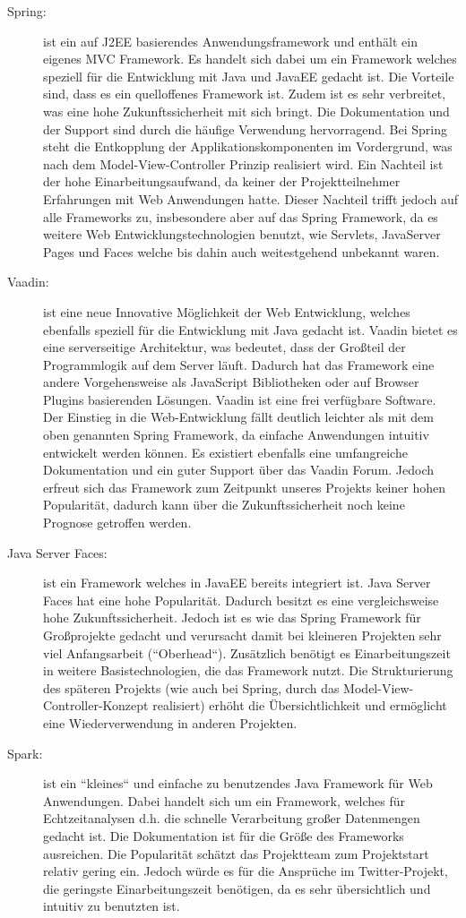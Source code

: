 \begin{description}
	\item [Spring:] ist ein auf J2EE basierendes Anwendungsframework und enthält ein eigenes MVC Framework. Es handelt sich dabei um ein Framework welches speziell für die Entwicklung mit Java und JavaEE gedacht ist. Die Vorteile sind, dass es ein quelloffenes Framework ist. Zudem ist es sehr verbreitet, was eine hohe Zukunftssicherheit mit sich bringt. Die Dokumentation und der Support sind durch die häufige Verwendung hervorragend. Bei Spring steht die Entkopplung der Applikationskomponenten im Vordergrund, was nach dem Model-View-Controller Prinzip realisiert wird. Ein Nachteil ist der hohe Einarbeitungsaufwand, da keiner der Projektteilnehmer Erfahrungen mit Web Anwendungen hatte. Dieser Nachteil trifft jedoch auf alle Frameworks zu, insbesondere aber auf das Spring Framework, da es weitere Web Entwicklungstechnologien benutzt, wie Servlets, JavaServer Pages und Faces welche bis dahin auch weitestgehend unbekannt waren.
	\item [Vaadin:] ist eine neue Innovative Möglichkeit der Web Entwicklung, welches ebenfalls speziell für die Entwicklung mit Java gedacht ist. Vaadin bietet es eine serverseitige Architektur, was bedeutet, dass der Großteil der Programmlogik auf dem Server läuft. Dadurch hat das Framework eine andere Vorgehensweise als JavaScript Bibliotheken oder auf Browser Plugins basierenden Lösungen. Vaadin ist eine frei verfügbare Software. Der Einstieg in die Web-Entwicklung fällt deutlich leichter als mit dem oben genannten Spring Framework, da einfache Anwendungen intuitiv entwickelt werden können. Es existiert ebenfalls eine umfangreiche Dokumentation und ein guter Support über das Vaadin Forum. Jedoch erfreut sich das Framework zum Zeitpunkt unseres Projekts keiner hohen Popularität, dadurch kann über die Zukunftssicherheit noch keine Prognose getroffen werden. 
	\item [Java Server Faces:] ist ein Framework welches in JavaEE bereits integriert ist. Java Server Faces hat eine hohe Popularität. Dadurch besitzt es eine vergleichsweise hohe Zukunftssicherheit. Jedoch ist es wie das Spring Framework für Großprojekte gedacht und verursacht damit bei kleineren Projekten sehr viel Anfangsarbeit (“Oberhead“). Zusätzlich benötigt es Einarbeitungszeit in weitere Basistechnologien, die das Framework nutzt. Die Strukturierung des späteren Projekts (wie auch bei Spring, durch das Model-View-Controller-Konzept realisiert) erhöht die Übersichtlichkeit und ermöglicht eine Wiederverwendung in anderen Projekten.
	\item [Spark:] ist ein “kleines“ und einfache zu benutzendes Java Framework für Web Anwendungen. Dabei handelt sich um ein Framework, welches für Echtzeitanalysen d.h. die schnelle Verarbeitung großer Datenmengen gedacht ist. Die Dokumentation ist für die Größe des Frameworks ausreichen. Die Popularität schätzt das Projektteam zum Projektstart relativ gering ein. Jedoch würde es für die Ansprüche im Twitter-Projekt, die geringste Einarbeitungszeit benötigen, da es sehr übersichtlich und intuitiv zu benutzten ist. 
\end{description}

